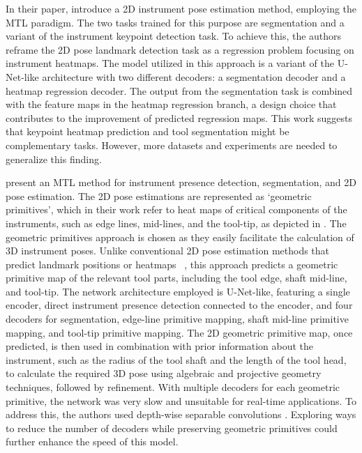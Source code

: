 In their paper, \citet{concurrent_segmentation_iro_laina} introduce a 2D instrument pose estimation method, employing the MTL paradigm. The two tasks trained for this purpose are segmentation and a variant of the instrument keypoint detection task. To achieve this, the authors reframe the 2D pose landmark detection task as a regression problem focusing on instrument heatmaps.
The model utilized in this approach is a variant of the U-Net-like architecture with two different decoders: a segmentation decoder and a heatmap regression decoder.  The output from the segmentation task is combined with the feature maps in the heatmap regression branch, a design choice that contributes to the improvement of predicted regression maps. This work suggests that keypoint heatmap prediction and tool segmentation might be complementary tasks. However, more datasets and experiments are needed to generalize this finding.

\citet{art_net} present an MTL method for instrument presence detection, segmentation, and 2D pose estimation. The 2D pose estimations are represented as `geometric primitives', which in their work refer to heat maps of critical components of the instruments, such as edge lines, mid-lines, and the tool-tip, as depicted in  . The geometric primitives approach is chosen as they easily facilitate the calculation of 3D instrument poses.
Unlike conventional 2D pose estimation methods that predict landmark positions \citep{multi_semi_pose} or heatmaps ~\citep{concurrent_segmentation_iro_laina}, this approach predicts a geometric primitive map of the relevant tool parts, including the tool edge, shaft mid-line, and tool-tip. The network architecture employed is U-Net-like, featuring a single encoder, direct instrument presence detection connected to the encoder, and four decoders for segmentation, edge-line primitive mapping, shaft mid-line primitive mapping, and tool-tip primitive mapping.
The 2D geometric primitive map, once predicted, is then used in combination with prior information about the instrument, such as the radius of the tool shaft and the length of the tool head, to calculate the required 3D pose using algebraic and projective geometry techniques, followed by refinement. 
With multiple decoders for each geometric primitive, the network was very slow and unsuitable for real-time applications. To address this, the authors used depth-wise separable convolutions \citep{chollet2017xception}. Exploring ways to reduce the number of decoders while preserving geometric primitives could further enhance the speed of this model.


